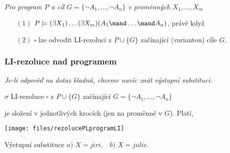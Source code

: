     {\bf {}}\ \ {\it Pro program $P$ a cíl $G=\{\neg A_1, \dots, \neg A_n\}$ v proměnných $X_1,\dots,X_m$
    
    \vspace{-0mm}
    \begin{enumerate}
    \item[$(1)$] $P \models (\exists X_1)\dots(\exists X_m)(A_1\mand \dots \mand A_n)$, právě když
    \smallskip
    
    \item[$(2)$] $\square$ lze odvodit LI-rezolucí z $P\cup\{G\}$ začínající (variantou) cíle $G$.
    \end{enumerate}}
    
    
    
    \subsubsection*{LI-rezoluce nad programem}
    {\it Je-li odpověď na dotaz kladná, chceme navíc znát výstupní substituci.}
    \medskip
    
     $\sigma$ LI-rezoluce $\square$ z $P\cup\{G\}$ začínající $G=\{\neg A_1,\dots,\neg A_n\}$
    \smallskip
    
    je složení  v jednotlivých krocích (jen na proměnné v $G$). Platí,
    \vspace{-2mm}
    
    \vspace{-2mm}
    
    \centerline{\texttt{[image: files/rezolucePLprogramLI]}}
    \bigskip
    
    Výstupní substituce $a)$ $X=jiri$,\ \ $b)$ $X=julie$.
    
    



